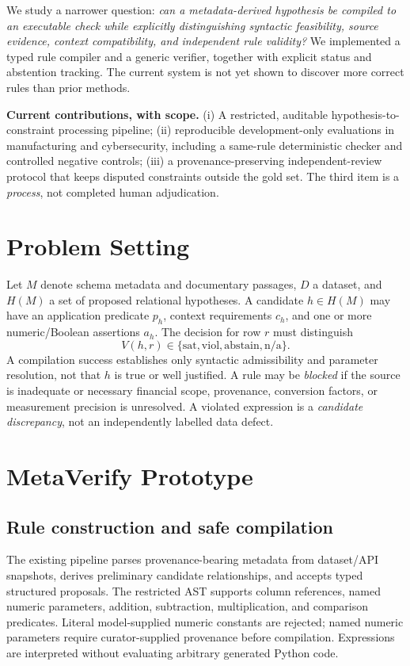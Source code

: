 \documentclass[conference]{IEEEtran}
\begin{document}
We study a narrower question: \emph{can a metadata-derived hypothesis be compiled to an executable check while explicitly distinguishing syntactic feasibility, source evidence, context compatibility, and independent rule validity?} We implemented a typed rule compiler and a generic verifier, together with explicit status and abstention tracking. The current system is not yet shown to discover more correct rules than prior methods.

\textbf{Current contributions, with scope.} (i) A restricted, auditable hypothesis-to-constraint processing pipeline; (ii) reproducible development-only evaluations in manufacturing and cybersecurity, including a same-rule deterministic checker and controlled negative controls; (iii) a provenance-preserving independent-review protocol that keeps disputed constraints outside the gold set. The third item is a \emph{process}, not completed human adjudication.

\section{Problem Setting}
Let $M$ denote schema metadata and documentary passages, $D$ a dataset, and $H(M)$ a set of proposed relational hypotheses. A candidate $h\in H(M)$ may have an application predicate $p_h$, context requirements $c_h$, and one or more numeric/Boolean assertions $a_h$. The decision for row $r$ must distinguish
\begin{equation}
V(h,r)\in\{\mathrm{sat},\mathrm{viol},\mathrm{abstain},\mathrm{n/a}\}.
\end{equation}
A compilation success establishes only syntactic admissibility and parameter resolution, not that $h$ is true or well justified. A rule may be \emph{blocked} if the source is inadequate or necessary financial scope, provenance, conversion factors, or measurement precision is unresolved. A violated expression is a \emph{candidate discrepancy}, not an independently labelled data defect.

\section{MetaVerify Prototype}
\subsection{Rule construction and safe compilation}
The existing pipeline parses provenance-bearing metadata from dataset/API snapshots, derives preliminary candidate relationships, and accepts typed structured proposals. The restricted AST supports column references, named numeric parameters, addition, subtraction, multiplication, and comparison predicates. Literal model-supplied numeric constants are rejected; named numeric parameters require curator-supplied provenance before compilation. Expressions are interpreted without evaluating arbitrary generated Python code.
\end{document}
